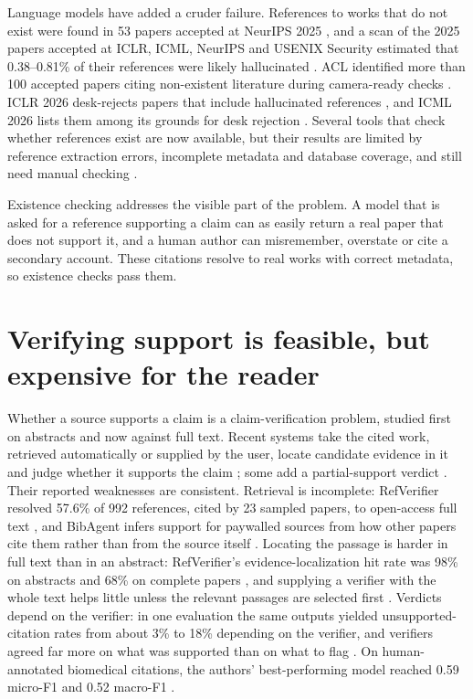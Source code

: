 \documentclass[11pt]{article}
\begin{document}
Language models have added a cruder failure. References to works that do not exist were found in 53 papers accepted at NeurIPS 2025 \citep{ansari2026compound}, and a scan of the 2025 papers accepted at ICLR, ICML, NeurIPS and USENIX Security estimated that 0.38--0.81\% of their references were likely hallucinated \citep{russinovich2026phantom}. ACL identified more than 100 accepted papers citing non-existent literature during camera-ready checks \citep{acl2026statement}. ICLR 2026 desk-rejects papers that include hallucinated references \citep{iclr2026response}, and ICML 2026 lists them among its grounds for desk rejection \citep{icml2026ethics}. Several tools that check whether references exist are now available, but their results are limited by reference extraction errors, incomplete metadata and database coverage, and still need manual checking \citep{badalova2026hallucinated}.

Existence checking addresses the visible part of the problem. A model that is asked for a reference supporting a claim can as easily return a real paper that does not support it, and a human author can misremember, overstate or cite a secondary account. These citations resolve to real works with correct metadata, so existence checks pass them.

\section{Verifying support is feasible, but expensive for the reader}

Whether a source supports a claim is a claim-verification problem, studied first on abstracts \citep{wadden2020scifact} and now against full text. Recent systems take the cited work, retrieved automatically or supplied by the user, locate candidate evidence in it and judge whether it supports the claim \citep{haan2025semanticcite,mocan2026refverifier,sadeghi2026deepsciverify,lee2026reflens,li2026bibagent}; some add a partial-support verdict \citep{haan2025semanticcite,mocan2026refverifier}. Their reported weaknesses are consistent. Retrieval is incomplete: RefVerifier resolved 57.6\% of 992 references, cited by 23 sampled papers, to open-access full text \citep{mocan2026refverifier}, and BibAgent infers support for paywalled sources from how other papers cite them rather than from the source itself \citep{li2026bibagent}. Locating the passage is harder in full text than in an abstract: RefVerifier's evidence-localization hit rate was 98\% on abstracts and 68\% on complete papers \citep{mocan2026refverifier}, and supplying a verifier with the whole text helps little unless the relevant passages are selected first \citep{sadeghi2026deepsciverify}. Verdicts depend on the verifier: in one evaluation the same outputs yielded unsupported-citation rates from about 3\% to 18\% depending on the verifier, and verifiers agreed far more on what was supported than on what to flag \citep{goo2026citefaithfulness}. On human-annotated biomedical citations, the authors' best-performing model reached 0.59 micro-F1 and 0.52 macro-F1 \citep{sarol2024citationintegrity}.
\end{document}
